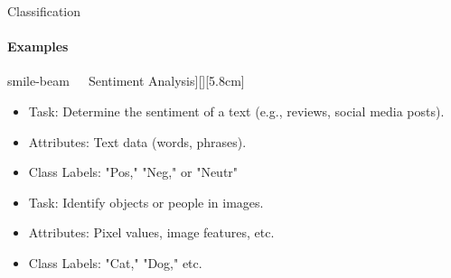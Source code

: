 \documentclass[aspectratio=169]{beamer}
\begin{document}
\begin{frame}{Classification}
    \framesubtitle{Examples}

    \vspace{-0.8cm}
    \begin{minipage}[t]{0.32\textwidth}
    
        \begin{coloredblock}[yellow][\centering\faIcon[regular]{smile-beam}~~~Sentiment Analysis][\footnotesize][5.8cm]
            \begin{itemize}
                \item \scriptsize Task: Determine the sentiment of a text (e.g., reviews, social media posts).
                \item \scriptsize Attributes: Text data (words, phrases).
                \item \scriptsize Class Labels: "Pos," "Neg," or "Neutr"
            \end{itemize}
        \end{coloredblock}
        \vspace{0.3cm}
        \begin{coloredblock}
                \begin{itemize}
                    \item \scriptsize Task: Identify objects or people in images.
                    \item \scriptsize Attributes: Pixel values, image features, etc.
                    \item \scriptsize Class Labels: "Cat," "Dog," etc.
                \end{itemize}
        \end{coloredblock}
        

\end{minipage}
\end{frame}
\end{document}
